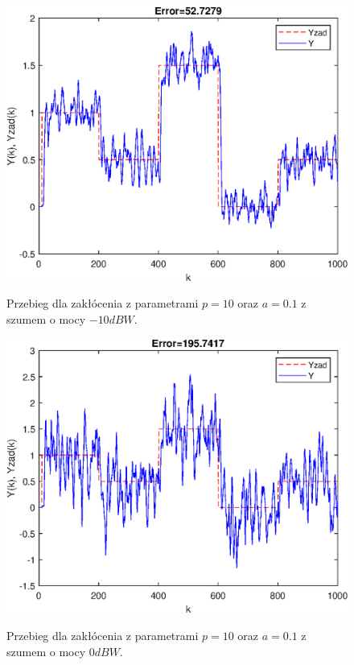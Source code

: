 \begin{figure}[h!]
	\centering
	\includegraphics[scale=1]{Rys/szum-10}
	\label{fig:szum-10}
	\caption{Przebieg dla zakłócenia z parametrami $p=10$ oraz $a=0.1$ z szumem o mocy $-10 dBW$.}
\end{figure}
\begin{figure}[h!]
	\centering
	\includegraphics[scale=1]{Rys/szum0}
	\label{fig:szum0}
	\caption{Przebieg dla zakłócenia z parametrami $p=10$ oraz $a=0.1$ z szumem o mocy $0 dBW$.}
\end{figure}
\FloatBarrier
